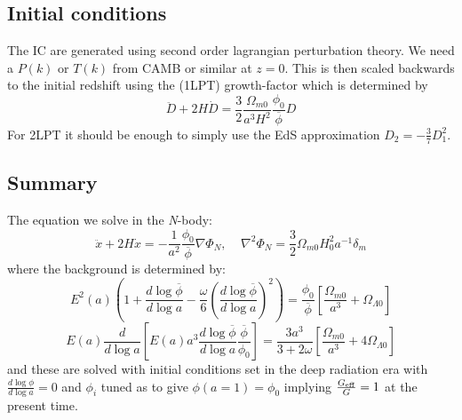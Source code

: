 \documentclass[usenatbib]{article}
\begin{document}
\subsection*{Initial conditions}

The IC are generated using second order lagrangian perturbation theory. We need a $P(k)$ or $T(k)$ from CAMB or similar at $z=0$. This is then scaled backwards to the initial redshift using the (1LPT) growth-factor which is determined by
$$\ddot{D} + 2H\dot{D} = \frac{3}{2}\frac{\Omega_{m0}}{a^3 H^2}\frac{\phi_0}{\overline{\phi}} D$$
For 2LPT it should be enough to simply use the EdS approximation $D_2 = -\frac{3}{7}D_1^2$.

\subsection*{Summary}

The equation we solve in the {\it N}-body:
$$\ddot{x} + 2H\dot{x} = -\frac{1}{a^2}\frac{\phi_0}{\overline{\phi}}\nabla \Phi_N,~~~~~\nabla^2\Phi_N = \frac{3}{2}\Omega_{m0}H_0^2 a^{-1} \delta_m$$
where the background is determined by:
$$E^2(a)\left(1 + \frac{d\log \overline{\phi}}{d\log a} - \frac{\omega}{6}\left(\frac{d\log \overline{\phi}}{d\log a}\right)^2\right) = \frac{\phi_0}{\overline{\phi}}\left[\frac{\Omega_{m0}}{a^3} + \Omega_{\Lambda 0}\right]$$
$$E(a)\frac{d}{d\log a}\left[E(a)a^3 \frac{d\log \overline{\phi}}{d\log a} \frac{\overline{\phi}}{\phi_0}\right] = \frac{3 a^3}{3+2\omega}\left[\frac{\Omega_{m0}}{a^3} + 4 \Omega_{\Lambda 0}\right]$$
and these are solved with initial conditions set in the deep radiation era with $\frac{d\log\phi}{d\log a} = 0$ and $\phi_i$ tuned as to give $\phi(a=1) = \phi_0$ implying $\frac{G_{\rm eff}}{G} = 1$ at the present time.
\end{document}
